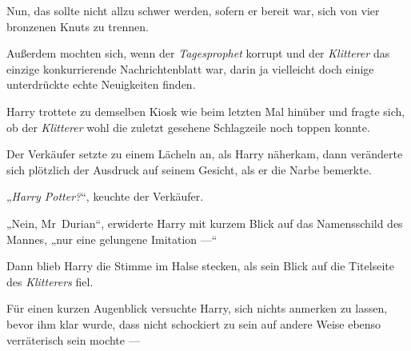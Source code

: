 Nun, das sollte nicht allzu schwer werden, sofern er bereit war, sich von vier bronzenen Knuts zu trennen.

Außerdem mochten sich, wenn der \emph{Tagesprophet} korrupt und der \emph{Klitterer} das einzige konkurrierende Nachrichtenblatt war, darin ja vielleicht doch einige unterdrückte echte Neuigkeiten finden.

Harry trottete zu demselben Kiosk wie beim letzten Mal hinüber und fragte sich, ob der \emph{Klitterer} wohl die zuletzt gesehene Schlagzeile noch toppen konnte.

Der Verkäufer setzte zu einem Lächeln an, als Harry näherkam, dann veränderte sich plötzlich der Ausdruck auf seinem Gesicht, als er die Narbe bemerkte.

„\emph{Harry Potter?}“, keuchte der Verkäufer.

„Nein, Mr~Durian“, erwiderte Harry mit kurzem Blick auf das Namensschild des Mannes, „nur eine gelungene Imitation —“

Dann blieb Harry die Stimme im Halse stecken, als sein Blick auf die Titelseite des \emph{Klitterers} fiel.


Für einen kurzen Augenblick versuchte Harry, sich nichts anmerken zu lassen, bevor ihm klar wurde, dass nicht schockiert zu sein auf andere Weise ebenso verräterisch sein mochte —

